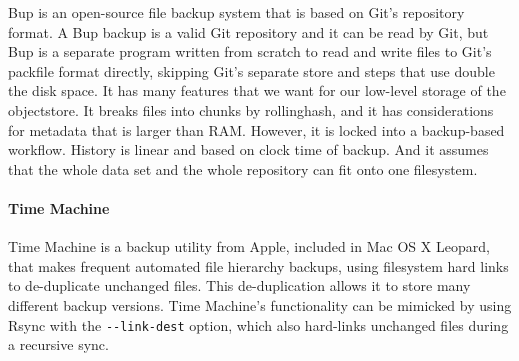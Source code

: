 Bup \cite{bup_homepage} is an open-source file backup system that is based on
Git's repository format. A Bup backup is a valid Git repository and it can be
read by Git, but Bup is a separate program written from scratch to read and
write files to Git's \gls{packfile} format directly, skipping Git's separate
store and  steps that use double the disk space. It has
many features that we want for our low-level storage of the \gls{objectstore}.
It breaks files into chunks by \gls{rollinghash}, and it has considerations for
metadata that is larger than RAM. However, it is locked into a backup-based
workflow. History is linear and based on clock time of backup. And it assumes
that the whole data set and the whole repository can fit onto one filesystem.


\paragraph{Time Machine}

Time Machine\cite{timemachine_patent} is a backup utility from Apple, included
in Mac OS X Leopard, that makes frequent automated file hierarchy backups, using
filesystem hard links to de-duplicate unchanged files\cite{timemachine_magic}.
This de-duplication allows it to store many different backup versions. Time
Machine's functionality can be mimicked by using Rsync with the
\lstinline{--link-dest} option, which also hard-links unchanged files during a
recursive sync\cite{timemachine_foreveryunix}.
